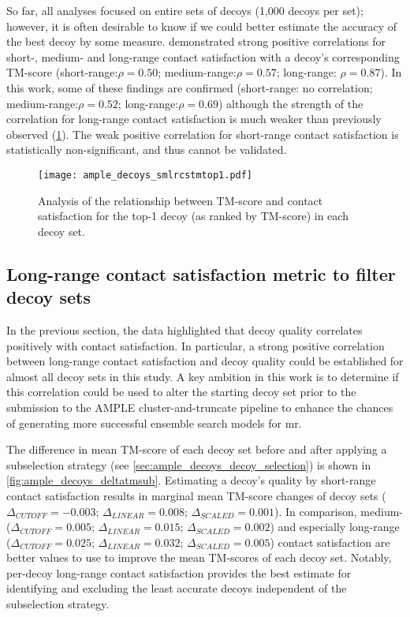 So far, all analyses focused on entire sets of decoys (1,000 decoys per set); however, it is often desirable to know if we could better estimate the accuracy of the best decoy by some measure. \textcite{Kosciolek2014-bt} demonstrated strong positive correlations for short-, medium- and long-range contact satisfaction with a decoy's corresponding TM-score (short-range:$\rho=0.50$; medium-range:$\rho=0.57$; long-range: $\rho=0.87$). In this work, some of these findings are confirmed (short-range: no correlation; medium-range:$\rho=0.52$; long-range:$\rho=0.69$) although the strength of the correlation for long-range contact satisfaction is much weaker than previously observed (\cref{fig:ample_decoys_smlrcstmtop1}). The weak positive correlation for short-range contact satisfaction is statistically non-significant, and thus cannot be validated. 

\begin{figure}[H]
	\centering
        \texttt{[image: ample\_decoys\_smlrcstmtop1.pdf]}
        \caption[Top-1 decoy TM-score and contact satisfaction analysis]{Analysis of the relationship between TM-score and contact satisfaction for the top-1 decoy (as ranked by TM-score) in each decoy set.}
	\label{fig:ample_decoys_smlrcstmtop1}
\end{figure}

\subsection{Long-range contact satisfaction metric to filter decoy sets}
In the previous section, the data highlighted that decoy quality correlates positively with contact satisfaction. In particular, a strong positive correlation between long-range contact satisfaction and decoy quality could be established for almost all decoy sets in this study. A key ambition in this work is to determine if this correlation could be used to alter the starting decoy set prior to the submission to the AMPLE cluster-and-truncate pipeline to enhance the chances of generating more successful ensemble search models for \gls{mr}.

The difference in mean TM-score of each decoy set before and after applying a subselection strategy (see \cref{sec:ample_decoys_decoy_selection}) is shown in \cref{fig:ample_decoys_deltatmsub}. Estimating a decoy's quality by short-range contact satisfaction results in marginal mean TM-score changes of decoy sets ($\Delta_{CUTOFF}=-0.003$; $\Delta_{LINEAR}=0.008$; $\Delta_{SCALED}=0.001$). In comparison, medium- ($\Delta_{CUTOFF}=0.005$; $\Delta_{LINEAR}=0.015$; $\Delta_{SCALED}=0.002$) and especially long-range ($\Delta_{CUTOFF}=0.025$; $\Delta_{LINEAR}=0.032$; $\Delta_{SCALED}=0.005$) contact satisfaction are better values to use to improve the mean TM-scores of each decoy set. Notably, per-decoy long-range contact satisfaction provides the best estimate for identifying and excluding the least accurate decoys independent of the subselection strategy. 

